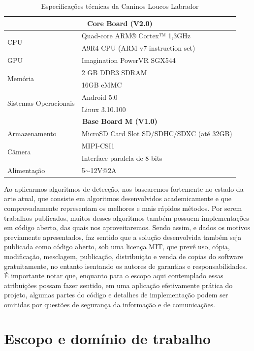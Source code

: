 \documentclass[]{politex}
\begin{document}
\begin{table}[ht]
\centering
\begin{tabular}{|l|l|}
\hline
\multicolumn{2}{|c|}{\textbf{Core Board (V2.0)}} \\ \hline
\multirow{2}{*}{CPU} & Quad-core ARM® Cortex™ 1,3GHz \\ \cline{2-2} 
 & A9R4 CPU (ARM v7 instruction set) \\ \hline
GPU & Imagination PowerVR SGX544 \\ \hline
\multirow{2}{*}{Memória} & 2 GB DDR3 SDRAM \\ \cline{2-2} 
 & 16GB eMMC \\ \hline
\multirow{2}{*}{Sistemas Operacionais} & Android 5.0 \\ \cline{2-2} 
 & Linux 3.10.100 \\ \hline
\multicolumn{2}{|c|}{\textbf{Base Board M (V1.0)}} \\ \hline
Armazenamento & MicroSD Card Slot SD/SDHC/SDXC (até 32GB) \\ \hline
\multirow{2}{*}{Câmera} & MIPI-CSI1 \\ \cline{2-2} 
 & Interface paralela de 8-bits \\ \hline
Alimentação & 5$\sim$12V@2A \\ \hline
\end{tabular}
\caption{Especificações técnicas da Caninos Loucos Labrador}
\label{tbl:specs}
\end{table}

Ao aplicarmos algoritmos de detecção, nos basearemos fortemente no estado da arte atual, que consiste em algoritmos desenvolvidos academicamente e que comprovadamente representam os melhores e mais rápidos métodos. Por serem trabalhos publicados, muitos desses algoritmos também possuem implementações em código aberto, das quais nos aproveitaremos. Sendo assim, e dados os motivos previamente apresentados, faz sentido que a solução desenvolvida também seja publicada como código aberto, sob uma licença MIT, que prevê uso, cópia, modificação, mesclagem, publicação, distribuição e venda de copias do software gratuitamente, no entanto isentando os autores de garantias e responsabilidades. É importante notar que, enquanto para o escopo aqui contemplado essas atribuições possam fazer sentido, em uma aplicação efetivamente prática do projeto, algumas partes do código e detalhes de implementação podem ser omitidas por questões de segurança da informação e de comunicações.

\section{Escopo e domínio de trabalho}
\end{document}
